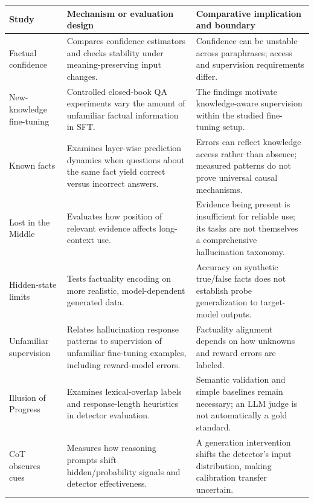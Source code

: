 \begin{table}[tp]
\centering\small\setlength{\tabcolsep}{5pt}\renewcommand{\arraystretch}{1.18}
\begin{tabularx}{\textwidth}{@{}p{}p{}X@{}}\toprule
Study & Mechanism or evaluation design & Comparative implication and boundary \\\midrule
Factual confidence \citep{mahaut-etal-2024-factual} & Compares confidence estimators and checks stability under meaning-preserving input changes. & Confidence can be unstable across paraphrases; access and supervision requirements differ. \\
New-knowledge fine-tuning \citep{gekhman-etal-2024-fine} & Controlled closed-book QA experiments vary the amount of unfamiliar factual information in SFT. & The findings motivate knowledge-aware supervision within the studied fine-tuning setup. \\
Known facts \citep{jiang-etal-2024-large} & Examines layer-wise prediction dynamics when questions about the same fact yield correct versus incorrect answers. & Errors can reflect knowledge access rather than absence; measured patterns do not prove universal causal mechanisms. \\
Lost in the Middle \citep{liu-etal-2024-lost} & Evaluates how position of relevant evidence affects long-context use. & Evidence being present is insufficient for reliable use; its tasks are not themselves a comprehensive hallucination taxonomy. \\
Hidden-state limits \citep{servedio-etal-2025-hidden} & Tests factuality encoding on more realistic, model-dependent generated data. & Accuracy on synthetic true/false facts does not establish probe generalization to target-model outputs. \\
Unfamiliar supervision \citep{kang-etal-2025-unfamiliar} & Relates hallucination response patterns to supervision of unfamiliar fine-tuning examples, including reward-model errors. & Factuality alignment depends on how unknowns and reward errors are labeled. \\
Illusion of Progress \citep{janiak-etal-2025-illusion} & Examines lexical-overlap labels and response-length heuristics in detector evaluation. & Semantic validation and simple baselines remain necessary; an LLM judge is not automatically a gold standard. \\
CoT obscures cues \citep{cheng-etal-2025-chain} & Measures how reasoning prompts shift hidden/probability signals and detector effectiveness. & A generation intervention shifts the detector's input distribution, making calibration transfer uncertain. \\

\end{tabularx}
\end{table}
